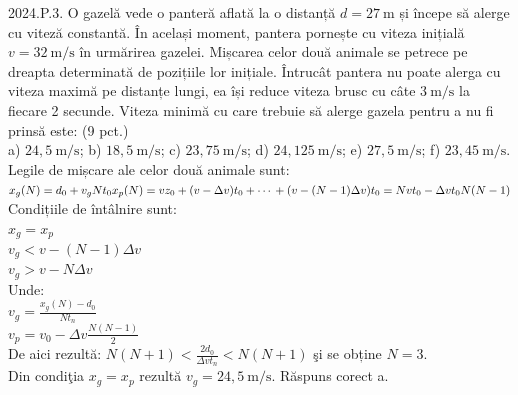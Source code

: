2024.P.3. O gazelă vede o panteră aflată la o distanță $d=27 \mathrm{~m}$ și începe să alerge cu viteză constantă. În același moment, pantera pornește cu viteza inițială $v=32 \mathrm{~m} / \mathrm{s}$ în urmărirea gazelei. Mișcarea celor două animale se petrece pe dreapta determinată de pozițiile lor inițiale. Întrucât pantera nu poate alerga cu viteza maximă pe distanțe lungi, ea își reduce viteza brusc cu câte $3 \mathrm{~m} / \mathrm{s}$ la fiecare 2 secunde. Viteza minimă cu care trebuie să alerge gazela pentru a nu fi prinsă este: (9 pct.)\\ a) $24,5 \mathrm{~m} / \mathrm{s}$; b) $18,5 \mathrm{~m} / \mathrm{s}$; c) $23,75 \mathrm{~m} / \mathrm{s}$; d) $24,125 \mathrm{~m} / \mathrm{s}$; e) $27,5 \mathrm{~m} / \mathrm{s}$; f) $23,45 \mathrm{~m} / \mathrm{s}$.\\ Legile de mișcare ale celor două animale sunt: $x_{g}(N)=d_{0}+v_{g} N t_{0}\\ x_{p}(N)=v z_{0}+(v-\Delta v) t_{0}+\cdots{ }+(v-(N-1) \Delta v) t_{0}=N v t_{0}-\Delta v t_{0} N(N-1)$\\ Condițiile de întâlnire sunt:\\ $x_{g}=x_{p}$\\ $v_{g}<v-(N-1) \Delta v$\\ $v_{g}>v-N \Delta v$\\ Unde:\\ $v_{g}=\frac{x_{g}(N)-d_{0}}{N t_{n}}$\\ $v_{p}=v_{0}-\Delta v \frac{N(N-1)}{2}$\\ De aici rezultă: $N(N+1)<\frac{2 d_{0}}{\Delta v t_{n}}<N(N+1)$ şi se obține $N=3$.\\ Din condiţia $x_{g}=x_{p}$ rezultă $v_{g}=24,5 \mathrm{~m} / \mathrm{s}$. Răspuns corect a.\\

